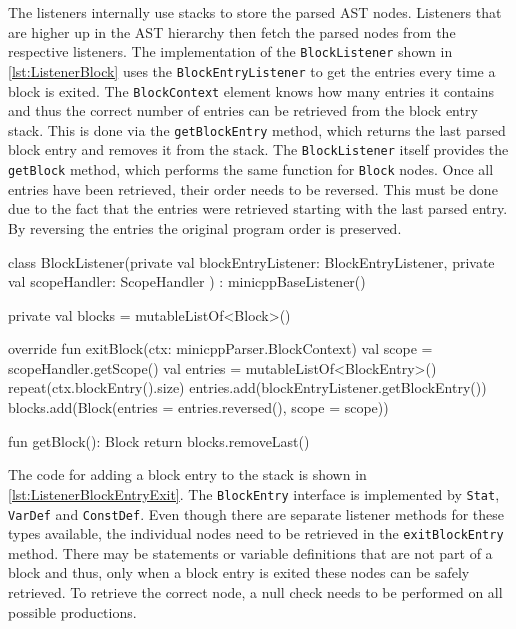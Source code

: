 The listeners internally use stacks to store the parsed AST nodes. Listeners that are higher up in the AST hierarchy then fetch the parsed nodes from the respective listeners. The implementation of the \verb|BlockListener| shown in \ref{lst:ListenerBlock} uses the \verb|BlockEntryListener| to get the entries every time a block is exited. The \verb|BlockContext| element knows how many entries it contains and thus the correct number of entries can be retrieved from the block entry stack. This is done via the \verb|getBlockEntry| method, which returns the last parsed block entry and removes it from the stack. The \verb|BlockListener| itself provides the \verb|getBlock| method, which performs the same function for \verb|Block| nodes. Once all entries have been retrieved, their order needs to be reversed. This must be done due to the fact that the entries were retrieved starting with the last parsed entry. By reversing the entries the original program order is preserved. 


\begin{KotlinCode}[float,numbers=none,caption=Implementation of the \texttt{BlockListener} class., label=lst:ListenerBlock]
class BlockListener(private val blockEntryListener: BlockEntryListener,
    private val scopeHandler: ScopeHandler
) : minicppBaseListener() {

    private val blocks = mutableListOf<Block>()
    
    override fun exitBlock(ctx: minicppParser.BlockContext) {
        val scope = scopeHandler.getScope()
        val entries = mutableListOf<BlockEntry>()
        repeat(ctx.blockEntry().size) {
            entries.add(blockEntryListener.getBlockEntry())
        }
        blocks.add(Block(entries = entries.reversed(), scope = scope))
    }
    
    fun getBlock(): Block {
        return blocks.removeLast()
}
}
    \end{KotlinCode}


The code for adding a block entry to the stack is shown in \ref{lst:ListenerBlockEntryExit}. The \verb|BlockEntry| interface is implemented by \verb|Stat|, \verb|VarDef| and \verb|ConstDef|. Even though there are separate listener methods for these types available, the individual nodes need to be retrieved in the \verb|exitBlockEntry| method. There may be statements or variable definitions that are not part of a block and thus, only when a block entry is exited these nodes can be safely retrieved. To retrieve the correct node, a null check needs to be performed on all possible productions. 


